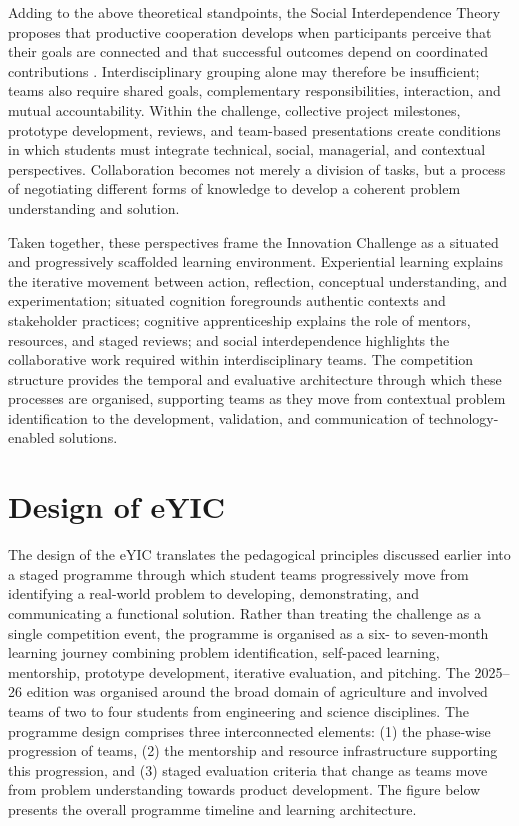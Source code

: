 \documentclass[runningheads]{llncs}
\begin{document}
Adding to the above theoretical standpoints, the Social Interdependence Theory proposes that productive cooperation develops when participants perceive that their goals are connected and that successful outcomes depend on coordinated contributions \cite{b37}. Interdisciplinary grouping alone may therefore be insufficient; teams also require shared goals, complementary responsibilities, interaction, and mutual accountability. Within the challenge, collective project milestones, prototype development, reviews, and team-based presentations create conditions in which students must integrate technical, social, managerial, and contextual perspectives. Collaboration becomes not merely a division of tasks, but a process of negotiating different forms of knowledge to develop a coherent problem understanding and solution.

Taken together, these perspectives frame the Innovation Challenge as a situated and progressively scaffolded learning environment. Experiential learning explains the iterative movement between action, reflection, conceptual understanding, and experimentation; situated cognition foregrounds authentic contexts and stakeholder practices; cognitive apprenticeship explains the role of mentors, resources, and staged reviews; and social interdependence highlights the collaborative work required within interdisciplinary teams. The competition structure provides the temporal and evaluative architecture through which these processes are organised, supporting teams as they move from contextual problem identification to the development, validation, and communication of technology-enabled solutions.

\section{Design of eYIC}

The design of the eYIC translates the pedagogical principles discussed earlier into a staged programme through which student teams progressively move from identifying a real-world problem to developing, demonstrating, and communicating a functional solution. Rather than treating the challenge as a single competition event, the programme is organised as a six- to seven-month learning journey combining problem identification, self-paced learning, mentorship, prototype development, iterative evaluation, and pitching. The 2025–26 edition was organised around the broad domain of agriculture and involved teams of two to four students from engineering and science disciplines. The programme design comprises three interconnected elements: (1) the phase-wise progression of teams, (2) the mentorship and resource infrastructure supporting this progression, and (3) staged evaluation criteria that change as teams move from problem understanding towards product development. The figure below  presents the overall programme timeline and learning architecture.
\end{document}
